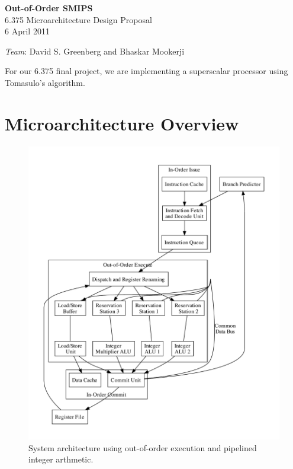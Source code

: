 \documentclass[12pt]{article}
\begin{document}
  \begin{center}
    \textbf{\large Out-of-Order SMIPS} \\
    6.375 Microarchitecture Design Proposal\\
    6 April 2011 \\
    
    \vspace{\baselineskip}
    
    \emph{Team}: David S. Greenberg and Bhaskar Mookerji
  \end{center}

For our 6.375 final project, we are implementing a superscalar processor using Tomasulo's algorithm.

\section{Microarchitecture Overview}

\begin{figure}[ht!]
    \centering
    \includegraphics[width=\textwidth]{figures/design.pdf}
    \caption{System architecture using out-of-order execution and pipelined integer arthmetic. \label{fig:design}}
\end{figure}
\end{document}
